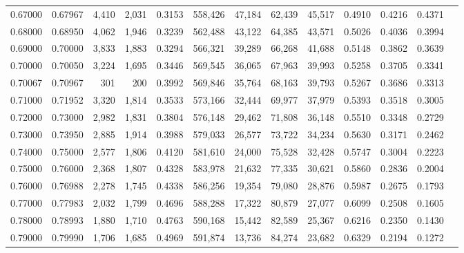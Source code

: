 \begin{tabular}{rrrrrrrrrrrrr}
0.67000 & 0.67967 &  4,410 & 2,031 &                                     0.3153 & 558,426 &  47,184 &  62,439 &  45,517 & 0.4910 & 0.4216 & 0.4371 \\
0.68000 & 0.68950 &  4,062 & 1,946 &                                     0.3239 & 562,488 &  43,122 &  64,385 &  43,571 & 0.5026 & 0.4036 & 0.3994 \\
0.69000 & 0.70000 &  3,833 & 1,883 &                                     0.3294 & 566,321 &  39,289 &  66,268 &  41,688 & 0.5148 & 0.3862 & 0.3639 \\
0.70000 & 0.70050 &  3,224 & 1,695 &                                     0.3446 & 569,545 &  36,065 &  67,963 &  39,993 & 0.5258 & 0.3705 & 0.3341 \\
0.70067 & 0.70967 &    301 &   200 &                                     0.3992 & 569,846 &  35,764 &  68,163 &  39,793 & 0.5267 & 0.3686 & 0.3313 \\
0.71000 & 0.71952 &  3,320 & 1,814 &                                     0.3533 & 573,166 &  32,444 &  69,977 &  37,979 & 0.5393 & 0.3518 & 0.3005 \\
0.72000 & 0.73000 &  2,982 & 1,831 &                                     0.3804 & 576,148 &  29,462 &  71,808 &  36,148 & 0.5510 & 0.3348 & 0.2729 \\
0.73000 & 0.73950 &  2,885 & 1,914 &                                     0.3988 & 579,033 &  26,577 &  73,722 &  34,234 & 0.5630 & 0.3171 & 0.2462 \\
0.74000 & 0.75000 &  2,577 & 1,806 &                                     0.4120 & 581,610 &  24,000 &  75,528 &  32,428 & 0.5747 & 0.3004 & 0.2223 \\
0.75000 & 0.76000 &  2,368 & 1,807 &                                     0.4328 & 583,978 &  21,632 &  77,335 &  30,621 & 0.5860 & 0.2836 & 0.2004 \\
0.76000 & 0.76988 &  2,278 & 1,745 &                                     0.4338 & 586,256 &  19,354 &  79,080 &  28,876 & 0.5987 & 0.2675 & 0.1793 \\
0.77000 & 0.77983 &  2,032 & 1,799 &                                     0.4696 & 588,288 &  17,322 &  80,879 &  27,077 & 0.6099 & 0.2508 & 0.1605 \\
0.78000 & 0.78993 &  1,880 & 1,710 &                                     0.4763 & 590,168 &  15,442 &  82,589 &  25,367 & 0.6216 & 0.2350 & 0.1430 \\
0.79000 & 0.79990 &  1,706 & 1,685 &                                     0.4969 & 591,874 &  13,736 &  84,274 &  23,682 & 0.6329 & 0.2194 & 0.1272 \\

\end{tabular}
